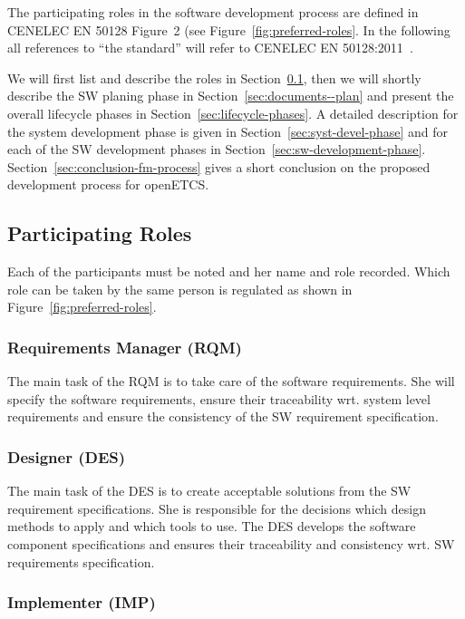 
The participating roles in the software development process are defined in
CENELEC EN 50128 Figure~2 (see Figure~\ref{fig:preferred-roles}. In the
following all references to ``the standard'' will refer to CENELEC EN
50128:2011~\cite{EN-50128}.

We will first list and describe the roles in
Section~\ref{sec:participating-roles}, then we will shortly describe the SW
planing phase in Section~\ref{sec:documents--plan} and present the overall
lifecycle phases in Section~\ref{sec:lifecycle-phases}. A detailed description
for the system development phase is given in Section~\ref{sec:syst-devel-phase}
and for each of the SW development phases in
Section~\ref{sec:sw-development-phase}. Section~\ref{sec:conclusion-fm-process}
gives a short conclusion on the proposed development process for openETCS.

\subsection{Participating Roles}
\label{sec:participating-roles}

Each of the participants must be noted and her name and role recorded. Which
role can be taken by the same person is regulated as shown in
Figure~\ref{fig:preferred-roles}.

\subsubsection{Requirements Manager (RQM)}
\label{sec:requ-magang-rqm}

The main task of the RQM is to take care of the software requirements. She will
specify the software requirements, ensure their traceability wrt. system level
requirements and ensure the consistency of the SW requirement specification.

\subsubsection{Designer (DES)}
\label{sec:designer}

The main task of the DES is to create acceptable solutions from the SW
requirement specifications. She is responsible for the decisions which design
methods to apply and which tools to use. The DES develops the software component
specifications and ensures their traceability and consistency wrt. SW
requirements specification.

\subsubsection{Implementer (IMP)}
\label{sec:implementer}

